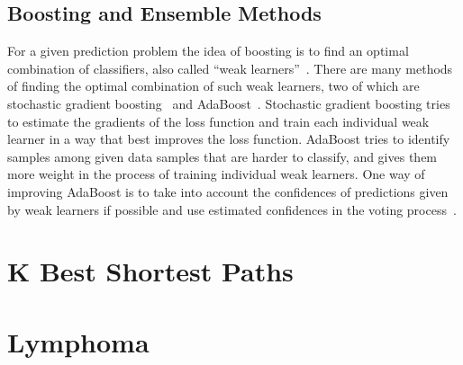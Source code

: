 \subsection{Boosting and Ensemble Methods}
For a given prediction problem the idea of boosting is to find an optimal combination of classifiers, also called ``weak learners''~\cite{ensemble2002}. There are many methods of finding the optimal combination of such weak learners, two of which are stochastic gradient boosting~\cite{friedman2002stochastic} and AdaBoost~\cite{adaboost97}. Stochastic gradient boosting tries to estimate the gradients of the loss function and train each individual weak learner in a way that best improves the loss function. AdaBoost tries to identify samples among given data samples that are harder to classify, and gives them more weight in the process of training individual weak learners. One way of improving AdaBoost is to take into account the confidences of predictions given by weak learners if possible and use estimated confidences in the voting process~\cite{adaboost99improved}.

\section{K Best Shortest Paths}

\section{Lymphoma}
